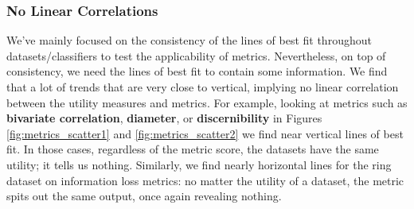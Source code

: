 \subsubsection{No Linear Correlations}
We've mainly focused on the consistency of the lines of best fit throughout datasets/classifiers to test the applicability of metrics. Nevertheless, on top of consistency, we need the lines of best fit to contain some information. We find that a lot of trends that are very close to vertical, implying no linear correlation between the utility measures and metrics. For example, looking at metrics such as \textbf{bivariate correlation}, \textbf{diameter}, or \textbf{discernibility} in Figures \ref{fig:metrics_scatter1} and \ref{fig:metrics_scatter2} we find near vertical lines of best fit. In those cases, regardless of the metric score, the datasets have the same utility; it tells us nothing. Similarly, we find nearly horizontal lines for the ring dataset on information loss metrics: no matter the utility of a dataset, the metric spits out the same output, once again revealing nothing.





